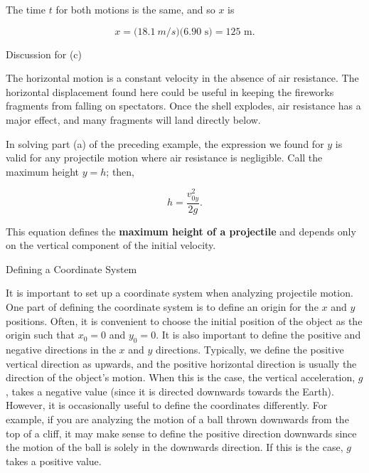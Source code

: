 \documentclass[
]{book}
\newenvironment{tinysection}{}{}
\newenvironment{note}{}{}
\begin{document}
The time \(t{}\) for both motions is the same, and so \(x{}\) is

\leavevmode\hypertarget{eip-685}{}%
\[{{x = (}\text{18}\text{.}1\ m/s)(6\text{.}\text{90\ s}{) = \text{125\ m.}}}{}\]

\begin{tinysection}

{Discussion for (c)}

\end{tinysection}

The horizontal motion is a constant velocity in the absence of air
resistance. The horizontal displacement found here could be useful in
keeping the fireworks fragments from falling on spectators. Once the
shell explodes, air resistance has a major effect, and many fragments
will land directly below.

In solving part (a) of the preceding example, the expression we found
for \(y{}\) is valid for any projectile motion where air resistance is
negligible. Call the maximum height \({y = h}{}\); then,

\leavevmode\hypertarget{eip-803}{}%
\[{{h = \frac{v_{0y}^{2}}{2g}}\text{.}}{}\]

This equation defines the \textbf{maximum height of a projectile} and depends
only on the vertical component of the initial velocity.

\hypertarget{fs-id1479427}{}
\begin{note}

Defining a Coordinate System

It is important to set up a coordinate system when analyzing projectile
motion. One part of defining the coordinate system is to define an
origin for the \(x{}\) and \(y{}\) positions. Often, it is convenient to
choose the initial position of the object as the origin such that
\({x_{0} = 0}{}\) and \({y_{0} = 0}{}\). It is also important to define the
positive and negative directions in the \(x{}\) and \(y{}\) directions.
Typically, we define the positive vertical direction as upwards, and the
positive horizontal direction is usually the direction of the object's
motion. When this is the case, the vertical acceleration, \(g{}\), takes a
negative value (since it is directed downwards towards the Earth).
However, it is occasionally useful to define the coordinates
differently. For example, if you are analyzing the motion of a ball
thrown downwards from the top of a cliff, it may make sense to define
the positive direction downwards since the motion of the ball is solely
in the downwards direction. If this is the case, \(g{}\) takes a positive
value.

\end{note}
\end{document}
